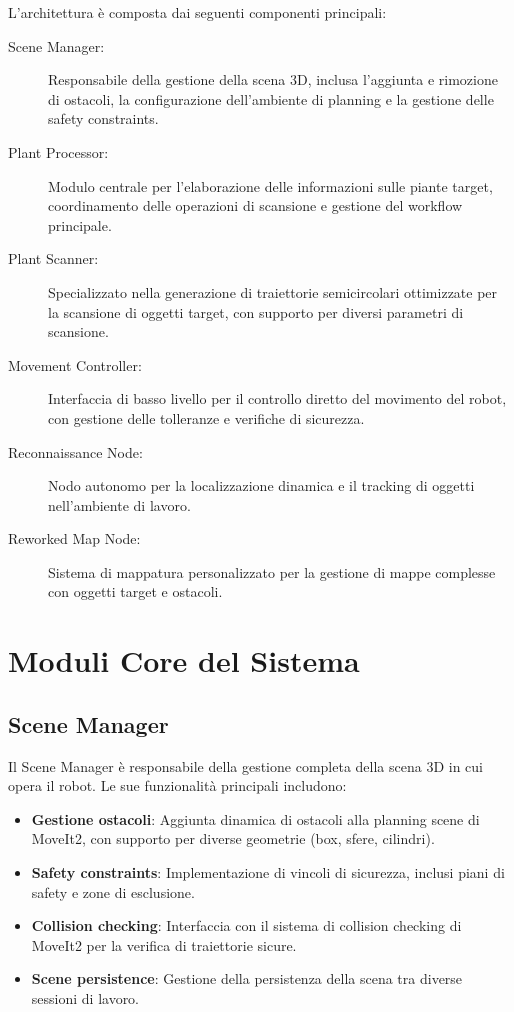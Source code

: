 \documentclass[12pt,a4paper,twoside,openright]{book}
\begin{document}
L'architettura è composta dai seguenti componenti principali:

\begin{description}
    \item[Scene Manager:] Responsabile della gestione della scena 3D, inclusa l'aggiunta e rimozione di ostacoli, la configurazione dell'ambiente di planning e la gestione delle safety constraints.
    
    \item[Plant Processor:] Modulo centrale per l'elaborazione delle informazioni sulle piante target, coordinamento delle operazioni di scansione e gestione del workflow principale.
    
    \item[Plant Scanner:] Specializzato nella generazione di traiettorie semicircolari ottimizzate per la scansione di oggetti target, con supporto per diversi parametri di scansione.
    
    \item[Movement Controller:] Interfaccia di basso livello per il controllo diretto del movimento del robot, con gestione delle tolleranze e verifiche di sicurezza.
    
    \item[Reconnaissance Node:] Nodo autonomo per la localizzazione dinamica e il tracking di oggetti nell'ambiente di lavoro.
    
    \item[Reworked Map Node:] Sistema di mappatura personalizzato per la gestione di mappe complesse con oggetti target e ostacoli.
\end{description}

\section{Moduli Core del Sistema}

\subsection{Scene Manager}

Il Scene Manager è responsabile della gestione completa della scena 3D in cui opera il robot. Le sue funzionalità principali includono:

\begin{itemize}
    \item \textbf{Gestione ostacoli}: Aggiunta dinamica di ostacoli alla planning scene di MoveIt2, con supporto per diverse geometrie (box, sfere, cilindri).
    
    \item \textbf{Safety constraints}: Implementazione di vincoli di sicurezza, inclusi piani di safety e zone di esclusione.
    
    \item \textbf{Collision checking}: Interfaccia con il sistema di collision checking di MoveIt2 per la verifica di traiettorie sicure.
    
    \item \textbf{Scene persistence}: Gestione della persistenza della scena tra diverse sessioni di lavoro.
\end{itemize}
\end{document}
